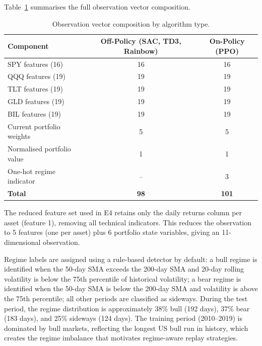 \documentclass[11pt,a4paper]{article}
\begin{document}
\noindent Table~\ref{tab:obs_breakdown} summarises the full observation vector composition.

\begin{table}[H]
\centering
\small
\caption{Observation vector composition by algorithm type.}
\label{tab:obs_breakdown}
\begin{tabular}{@{}lcc@{}}
\toprule
\textbf{Component} & \textbf{Off-Policy (SAC, TD3, Rainbow)} & \textbf{On-Policy (PPO)} \\
\midrule
SPY features (16)              & 16 & 16 \\
QQQ features (19)              & 19 & 19 \\
TLT features (19)              & 19 & 19 \\
GLD features (19)              & 19 & 19 \\
BIL features (19)              & 19 & 19 \\
Current portfolio weights      & 5  & 5  \\
Normalised portfolio value     & 1  & 1  \\
One-hot regime indicator       & -- & 3  \\
\midrule
\textbf{Total}                 & \textbf{98} & \textbf{101} \\
\bottomrule
\end{tabular}
\end{table}

The reduced feature set used in E4 retains only the daily returns column per asset (feature 1), removing all technical indicators. This reduces the observation to 5 features (one per asset) plus 6 portfolio state variables, giving an 11-dimensional observation.

Regime labels are assigned using a rule-based detector by default: a bull regime is identified when the 50-day SMA exceeds the 200-day SMA and 20-day rolling volatility is below the 75th percentile of historical volatility; a bear regime is identified when the 50-day SMA is below the 200-day SMA and volatility is above the 75th percentile; all other periods are classified as sideways. During the test period, the regime distribution is approximately 38\% bull (192 days), 37\% bear (183 days), and 25\% sideways (124 days). The training period (2010--2019) is dominated by bull markets, reflecting the longest US bull run in history, which creates the regime imbalance that motivates regime-aware replay strategies.
\end{document}
